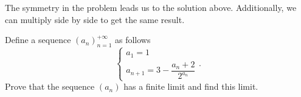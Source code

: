 \documentclass[11pt]{article}
\theoremstyle{definition}
\begin{document}
        \begin{remark}
            The symmetry in the problem leads us to the solution above. Additionally, we can multiply side by side to get the same result.
        \end{remark}

        \newpage

        \begin{problem}
            Define a sequence \((a_n)_{n=1}^{+\infty}\) as follows
            \[\begin{cases}
                a_1 = 1 \\
                a_{n+1} = 3 - \dfrac{a_n + 2}{2^{a_n}} 
            \end{cases}.\]
            Prove that the sequence \((a_n)\) has a finite limit and find this limit.
        \end{problem}
\end{document}
